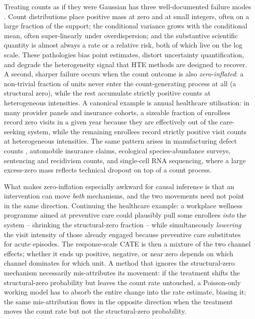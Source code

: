 \documentclass[11pt]{article}
\theoremstyle{plain}
\theoremstyle{definition}
\theoremstyle{remark}
\begin{document}
Treating counts as if they were Gaussian has three well-documented
failure modes \citep{camerontrivedi2013count, murray2021loglinear}.
Count distributions place positive mass at zero and at small
integers, often on a large fraction of the support; the conditional
variance grows with the conditional mean, often super-linearly under
overdispersion; and the substantive scientific quantity is almost
always a rate or a relative risk, both of which live on the log
scale. These pathologies bias point estimates, distort uncertainty
quantification, and degrade the heterogeneity signal that HTE methods
are designed to recover. A second, sharper failure occurs when the
count outcome is also \emph{zero-inflated}: a non-trivial fraction of
units never enter the count-generating process at all (a structural
zero), while the rest accumulate strictly positive counts at
heterogeneous intensities. A canonical example is annual healthcare
utilisation: in many provider panels and insurance cohorts, a
sizeable fraction of enrollees record zero visits in a given year
because they are effectively out of the care-seeking system, while
the remaining enrollees record strictly positive visit counts at
heterogeneous intensities. The same pattern arises in manufacturing
defect counts \citep{lambert1992zip}, automobile insurance claims,
ecological species-abundance surveys, sentencing and recidivism
counts, and single-cell RNA sequencing, where a large excess-zero
mass reflects technical dropout on top of a count process.

What makes zero-inflation especially awkward for causal inference is
that an intervention can move \emph{both} mechanisms, and the two
movements need not point in the same direction. Continuing the
healthcare example: a workplace wellness programme aimed at preventive
care could plausibly pull some enrollees \emph{into} the system --
shrinking the structural-zero fraction -- while simultaneously
\emph{lowering} the visit intensity of those already engaged because
preventive care substitutes for acute episodes. The response-scale
CATE is then a mixture of the two channel effects; whether it ends
up positive, negative, or near zero depends on which channel
dominates for which unit. A method that ignores the structural-zero
mechanism necessarily mis-attributes its movement: if the treatment
shifts the structural-zero probability but leaves the count rate
untouched, a Poisson-only working model has to absorb the entire
change into the rate estimate, biasing it; the same mis-attribution
flows in the opposite direction when the treatment moves the count
rate but not the structural-zero probability.
\end{document}
